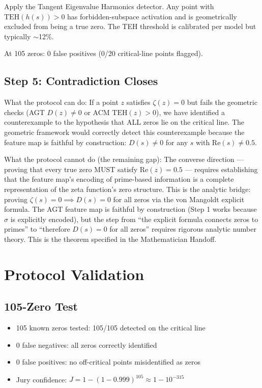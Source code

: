 \documentclass[11pt,a4paper]{article}
\begin{document}
Apply the Tangent Eigenvalue Harmonics detector. Any point with $\mathrm{TEH}(h(s)) > 0$ has forbidden-subspace activation and is geometrically excluded from being a true zero. The TEH threshold is calibrated per model but typically $\sim$12\%.

At 105 zeros: 0 false positives (0/20 critical-line points flagged).

\subsection{Step 5: Contradiction Closes}

What the protocol can do: If a point $z$ satisfies $\zeta(z) = 0$ but fails the geometric checks (AGT $D(z) \neq 0$ or ACM $\mathrm{TEH}(z) > 0$), we have identified a counterexample to the hypothesis that ALL zeros lie on the critical line. The geometric framework would correctly detect this counterexample because the feature map is faithful by construction: $D(s) \neq 0$ for any $s$ with $\mathrm{Re}(s) \neq 0.5$.

What the protocol cannot do (the remaining gap): The converse direction — proving that every true zero MUST satisfy $\mathrm{Re}(z) = 0.5$ — requires establishing that the feature map's encoding of prime-based information is a complete representation of the zeta function's zero structure. This is the analytic bridge: proving $\zeta(s)=0 \implies D(s)=0$ for all zeros via the von Mangoldt explicit formula. The AGT feature map is faithful by construction (Step 1 works because $\sigma$ is explicitly encoded), but the step from ``the explicit formula connects zeros to primes'' to ``therefore $D(s)=0$ for all zeros'' requires rigorous analytic number theory. This is the theorem specified in the Mathematician Handoff.

\section{Protocol Validation}

\subsection{105-Zero Test}

\begin{itemize}[nosep]
\item 105 known zeros tested: 105/105 detected on the critical line
\item 0 false negatives: all zeros correctly identified
\item 0 false positives: no off-critical points misidentified as zeros
\item Jury confidence: $J = 1 - (1-0.999)^{105} \approx 1 - 10^{-315}$
\end{itemize}
\end{document}
